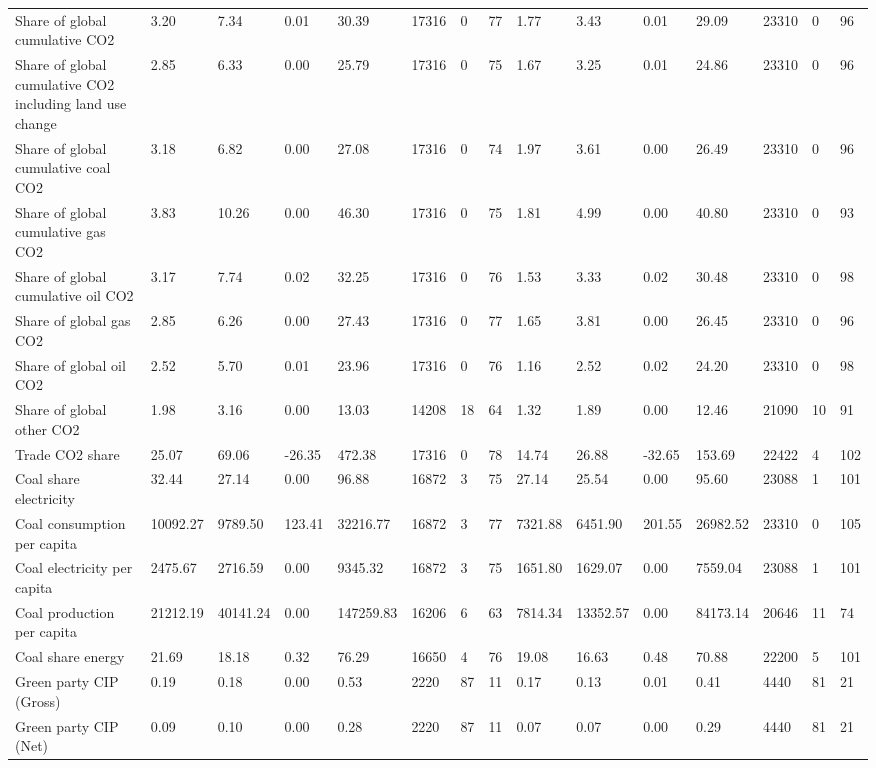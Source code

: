 \begin{longtable}{lllllllllllllll}
Share of global cumulative CO2 & 3.20 & 7.34 & 0.01 & 30.39 & 17316 & 0 & 77 & 1.77 & 3.43 & 0.01 & 29.09 & 23310 & 0 & 96\\
Share of global cumulative CO2 including land use change & 2.85 & 6.33 & 0.00 & 25.79 & 17316 & 0 & 75 & 1.67 & 3.25 & 0.01 & 24.86 & 23310 & 0 & 96\\
Share of global cumulative coal CO2 & 3.18 & 6.82 & 0.00 & 27.08 & 17316 & 0 & 74 & 1.97 & 3.61 & 0.00 & 26.49 & 23310 & 0 & 96\\
Share of global cumulative gas CO2 & 3.83 & 10.26 & 0.00 & 46.30 & 17316 & 0 & 75 & 1.81 & 4.99 & 0.00 & 40.80 & 23310 & 0 & 93\\
\addlinespace
Share of global cumulative oil CO2 & 3.17 & 7.74 & 0.02 & 32.25 & 17316 & 0 & 76 & 1.53 & 3.33 & 0.02 & 30.48 & 23310 & 0 & 98\\
Share of global gas CO2 & 2.85 & 6.26 & 0.00 & 27.43 & 17316 & 0 & 77 & 1.65 & 3.81 & 0.00 & 26.45 & 23310 & 0 & 96\\
Share of global oil CO2 & 2.52 & 5.70 & 0.01 & 23.96 & 17316 & 0 & 76 & 1.16 & 2.52 & 0.02 & 24.20 & 23310 & 0 & 98\\
Share of global other CO2 & 1.98 & 3.16 & 0.00 & 13.03 & 14208 & 18 & 64 & 1.32 & 1.89 & 0.00 & 12.46 & 21090 & 10 & 91\\
Trade CO2 share & 25.07 & 69.06 & -26.35 & 472.38 & 17316 & 0 & 78 & 14.74 & 26.88 & -32.65 & 153.69 & 22422 & 4 & 102\\
\addlinespace
Coal share electricity & 32.44 & 27.14 & 0.00 & 96.88 & 16872 & 3 & 75 & 27.14 & 25.54 & 0.00 & 95.60 & 23088 & 1 & 101\\
Coal consumption per capita & 10092.27 & 9789.50 & 123.41 & 32216.77 & 16872 & 3 & 77 & 7321.88 & 6451.90 & 201.55 & 26982.52 & 23310 & 0 & 105\\
Coal electricity per capita & 2475.67 & 2716.59 & 0.00 & 9345.32 & 16872 & 3 & 75 & 1651.80 & 1629.07 & 0.00 & 7559.04 & 23088 & 1 & 101\\
Coal production per capita & 21212.19 & 40141.24 & 0.00 & 147259.83 & 16206 & 6 & 63 & 7814.34 & 13352.57 & 0.00 & 84173.14 & 20646 & 11 & 74\\
Coal share energy & 21.69 & 18.18 & 0.32 & 76.29 & 16650 & 4 & 76 & 19.08 & 16.63 & 0.48 & 70.88 & 22200 & 5 & 101\\
\addlinespace
Green party CIP (Gross) & 0.19 & 0.18 & 0.00 & 0.53 & 2220 & 87 & 11 & 0.17 & 0.13 & 0.01 & 0.41 & 4440 & 81 & 21\\
Green party CIP (Net) & 0.09 & 0.10 & 0.00 & 0.28 & 2220 & 87 & 11 & 0.07 & 0.07 & 0.00 & 0.29 & 4440 & 81 & 21\\

\end{longtable}
